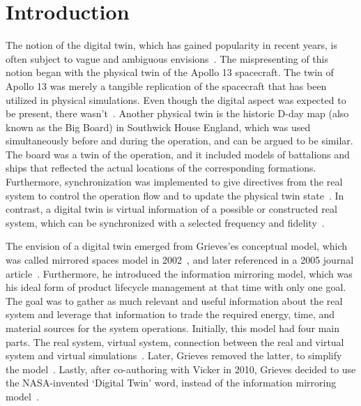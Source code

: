 \documentclass{llncs}
\begin{document}
    \section{Introduction}\label{section:introduction}
    The notion of the digital twin, which has gained popularity in recent years, is often subject to vague and ambiguous envisions~\cite{Review1}.
    The mispresenting of this notion began with the physical twin of the Apollo 13 spacecraft. 
    The twin of Apollo 13 was merely a tangible replication of the spacecraft that has been utilized in physical simulations. 
    Even though the digital aspect was expected to be present, there wasn't~\cite{GrievesMichaelApolloMyth}.
    Another physical twin is the historic D-day map (also known as the Big Board) in Southwick House England, 
    which was used simultaneously before and during the operation, and can be argued to be similar. 
    The board was a twin of the operation, and it included models of battalions and ships that reflected the actual 
    locations of the corresponding formations. Furthermore, synchronization was 
    implemented to give directives from the real system to control the operation 
    flow and to update the physical twin state~\cite{AMRC}.
    In contrast, a digital twin is virtual information of a possible or constructed real system, which can 
    be synchronized with a selected frequency and fidelity~\cite{Review1,Review2,digitaltwinconsortium2022}.

    The envision of a digital twin emerged from Grieves'es conceptual model, which was called mirrored spaces model in 2002~\cite{Originsofdigitaltwinconcept},
    and later referenced in a 2005 journal article~\cite{2005ArticleGrievesMichael}. 
    Furthermore, he introduced the information mirroring model, which was his ideal form of product lifecycle management
    at that time with only one goal. The goal was to gather as much relevant and useful information about the 
    real system and leverage that information to trade the required energy, time, 
    and material sources for the system operations.
    Initially, this model had four main parts. The real system, virtual system, 
    connection between the real and virtual system and virtual simulations~\cite{GrievesPLMBook}. 
    Later, Grieves removed the latter, to simplify the model~\cite{Originsofdigitaltwinconcept}. 
    Lastly, after co-authoring with Vicker in 2010, 
    Grieves decided to use the NASA-invented `Digital Twin' word, instead of the 
    information mirroring model~\cite{Originsofdigitaltwinconcept}.
\end{document}
